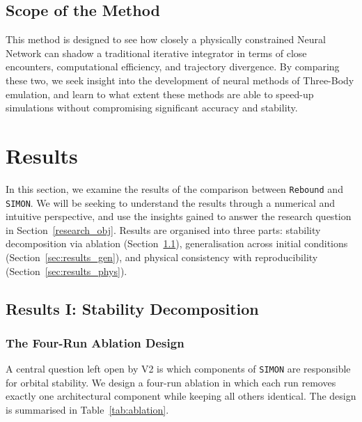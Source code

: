 \documentclass[12pt,a4paper]{article}
\newcommand{\simon}{\texttt{SIMON}}
\begin{document}
\subsection{Scope of the Method}
This method is designed to see how closely a physically constrained Neural Network can shadow a traditional iterative integrator in terms of close encounters, computational efficiency, and trajectory divergence. By comparing these two, we seek insight into the development of neural methods of Three-Body emulation, and learn to what extent these methods are able to speed-up simulations without compromising significant accuracy and stability.

\section{Results}
\label{sec:results}

In this section, we examine the results of the comparison between \texttt{Rebound} and \simon{}. We will be seeking to understand the results through a numerical and intuitive perspective, and use the insights gained to answer the research question in Section~\ref{research_obj}. Results are organised into three parts: stability decomposition via ablation (Section~\ref{sec:results_stab}), generalisation across initial conditions (Section~\ref{sec:results_gen}), and physical consistency with reproducibility (Section~\ref{sec:results_phys}).

\subsection{Results I: Stability Decomposition}
\label{sec:results_stab}

\subsubsection{The Four-Run Ablation Design}
\label{subsec:ablation_design}

A central question left open by V2 is which components of \simon{} are responsible for orbital stability. We design a four-run ablation in which each run removes exactly one architectural component while keeping all others identical. The design is summarised in Table~\ref{tab:ablation}.
\end{document}
